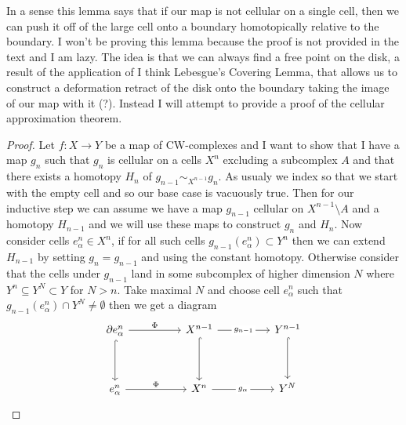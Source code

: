 \documentclass[40pt]{article}
\begin{document}
		In a sense this lemma says that if our map is not cellular on a single cell, then we can push it off of the large cell onto a boundary homotopically relative to the boundary. I won't be proving this lemma because the proof is not provided in the text and I am lazy. The idea is that we can always find a free point on the disk, a result of the application of I think Lebesgue's Covering Lemma, that allows us to construct a deformation retract of the disk onto the boundary taking the image of our map with it (?).  Instead I will attempt to provide a proof of the cellular approximation theorem.
		\begin{proof}
			Let $f: X\rightarrow Y$ be a map of CW-complexes and I want to show that I have a map $g_n$ such that $g_n$ is cellular on a cells $X^n$ excluding a subcomplex $A$ and that there exists a homotopy $H_{n}$ of $g_{n-1} \sim_{X^{n-1}} g_n$. As usualy we index so that we start with the empty cell and so our base case is vacuously true. Then for our inductive step we can assume we have a map $g_{n-1}$ cellular on $X^{n-1} \setminus A$ and a homotopy $H_{n-1}$ and we will use these maps to construct $g_n$ and $H_n$. Now consider cells $e_\alpha^n \in X^n$, if for all such cells $g_{n-1}(e_\alpha^n) \subset Y^n$ then we can extend $H_{n-1}$ by setting $g_n = g_{n-1}$ and using the constant homotopy. Otherwise consider that the cells under $g_{n-1}$ land in some subcomplex of higher dimension $N$ where $Y^n \subseteq Y^N \subset Y$ for $N > n$. Take maximal $N$ and choose cell $e_\alpha^n$ such that $g_{n-1}(e_\alpha^n) \cap Y^N \neq \emptyset$ then we get a diagram 
			\[\begin{tikzcd}
				{\partial e_\alpha^n} && {X^{n-1}} && {Y^{n-1}} \\
				\\
				{e_\alpha^n} && {X^n} && {Y^N}
				\arrow["\Phi", from=1-1, to=1-3]
				\arrow[hook, from=1-1, to=3-1]
				\arrow["{g_{n-1}}"{description}, from=1-3, to=1-5]
				\arrow[hook, from=1-3, to=3-3]
				\arrow[hook, from=1-5, to=3-5]
				\arrow["\Phi", from=3-1, to=3-3]
				\arrow["{g_\alpha}"{description}, from=3-3, to=3-5]
			\end{tikzcd}\]
		\end{proof}
\end{document}

